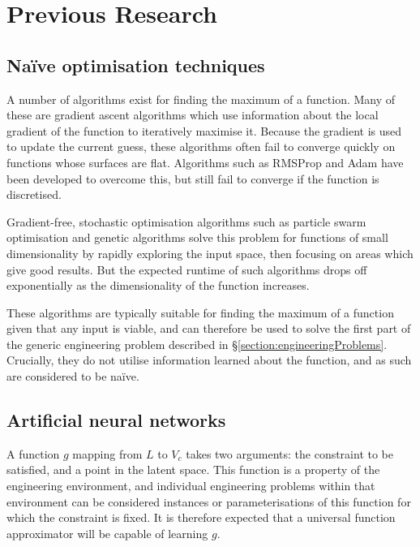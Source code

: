 \documentclass[../../main.tex]{subfiles}
\begin{document}
\chapter{Previous Research} \label{chapter:previousResearch}

\section{Na\"{i}ve optimisation techniques} \label{section:naiveOptimisationTechniques}

A number of algorithms exist for finding the maximum of a function.
Many of these are gradient ascent algorithms \cite{ruder17} which use information about the local gradient of the function to iteratively maximise it.
Because the gradient is used to update the current guess, these algorithms often fail to converge quickly on functions whose surfaces are flat.
Algorithms such as RMSProp \cite{hinton17} and Adam \cite{kingma17} have been developed to overcome this, but still fail to converge if the function is discretised.

Gradient-free, stochastic optimisation algorithms such as particle swarm optimisation \cite{kennedy12} and genetic algorithms \cite{carr14} solve this problem for functions of small dimensionality by rapidly exploring the input space, then focusing on areas which give good results.
But the expected runtime of such algorithms drops off exponentially as the dimensionality of the function increases.

These algorithms are typically suitable for finding the maximum of a function given that any input is viable, and can therefore be used to solve the first part of the generic engineering problem described in \S\ref{section:engineeringProblems}.
Crucially, they do not utilise information learned about the function, and as such are considered to be na\"{i}ve.

\section{Artificial neural networks} \label{section:artificialNeuralNetworks}

A function $g$ mapping from $L$ to $V_c$ takes two arguments: the constraint to be satisfied, and a point in the latent space.
This function is a property of the engineering environment, and individual engineering problems within that environment can be considered instances or parameterisations of this function for which the constraint is fixed.
It is therefore expected that a universal function approximator will be capable of learning $g$.
\end{document}
